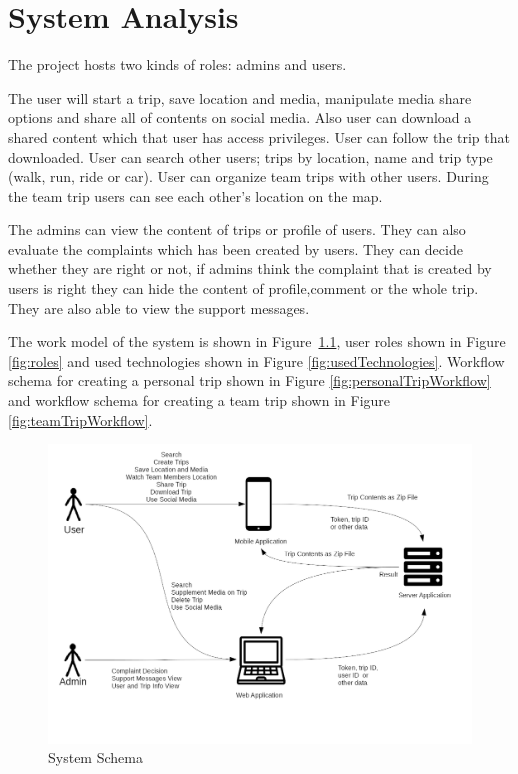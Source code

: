 \chapter{System Analysis}

The project hosts two kinds of roles: admins and users. 

The user will start a trip, save location and media, manipulate media share options and share all of contents on social media. Also user can download a shared content which that user has access privileges. User can follow the trip that downloaded. User can search other users; trips by location, name and trip type (walk, run, ride or car). User can organize team trips with other users. During the team trip users can see each other's location on the map.

The admins can view the content of trips or profile of users. They can also evaluate the complaints which has been created by users. They can decide whether they are right or not, if admins think the complaint that is created by users is right they can hide the content of profile,comment or the whole trip. They are also able to view the support messages. 

The work model of the system is shown in Figure~\ref{fig:system_diagram}, user roles shown in Figure \ref{fig:roles} and used technologies shown in Figure \ref{fig:usedTechnologies}. Workflow schema for creating a personal trip shown in Figure \ref{fig:personalTripWorkflow} and workflow schema for creating a team trip shown in Figure \ref{fig:teamTripWorkflow}. 

\begin{figure}[!htbp]
\centering
\includegraphics[width=\textwidth]{projectChapters/images/system_diagram.png}
\caption{System Schema}
\label{fig:system_diagram}
\end{figure}

